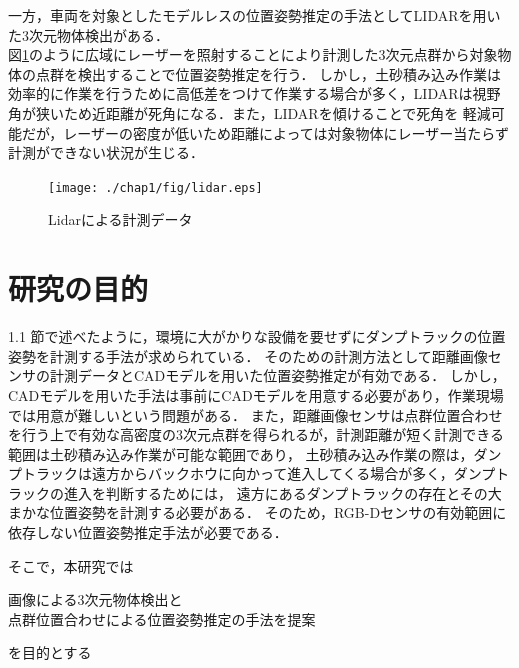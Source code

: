 \newpage

一方，車両を対象としたモデルレスの位置姿勢推定の手法としてLIDARを用いた3次元物体検出がある．\cite{Zhang2017}\cite{Chen2017}\cite{Lang2019}\\
図\ref{fig:Lidar}のように広域にレーザーを照射することにより計測した3次元点群から対象物体の点群を検出することで位置姿勢推定を行う．
しかし，土砂積み込み作業は効率的に作業を行うために高低差をつけて作業する場合が多く，LIDARは視野角が狭いため近距離が死角になる．また，LIDARを傾けることで死角を
軽減可能だが，レーザーの密度が低いため距離によっては対象物体にレーザー当たらず計測ができない状況が生じる．
\begin{figure}[b]
    \begin{center}
    \texttt{[image: ./chap1/fig/lidar.eps]}
    \caption{Lidarによる計測データ}
    \label{fig:Lidar}
    \end{center}
\end{figure}


\newpage
\section{研究の目的}
1.1 節で述べたように，環境に大がかりな設備を要せずにダンプトラックの位置姿勢を計測する手法が求められている．
そのための計測方法として距離画像センサの計測データとCADモデルを用いた位置姿勢推定が有効である．
しかし，CADモデルを用いた手法は事前にCADモデルを用意する必要があり，作業現場では用意が難しいという問題がある．
また，距離画像センサは点群位置合わせを行う上で有効な高密度の3次元点群を得られるが，計測距離が短く計測できる範囲は土砂積み込み作業が可能な範囲であり，
土砂積み込み作業の際は，ダンプトラックは遠方からバックホウに向かって進入してくる場合が多く，ダンプトラックの進入を判断するためには，
遠方にあるダンプトラックの存在とその大まかな位置姿勢を計測する必要がある．
そのため，RGB-Dセンサの有効範囲に依存しない位置姿勢推定手法が必要である．



\par
そこで，本研究では
    \begin{screen}
        \begin{center}
            画像による3次元物体検出と\\点群位置合わせによる位置姿勢推定の手法を提案
        \end{center}
    \end{screen}
を目的とする
\newpage
